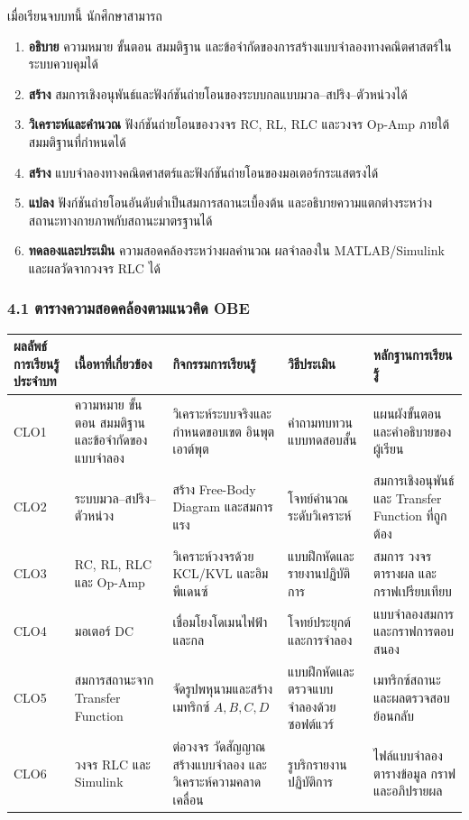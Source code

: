 เมื่อเรียนจบบทนี้ นักศึกษาสามารถ

\begin{enumerate}
    \item \textbf{อธิบาย} ความหมาย ขั้นตอน สมมติฐาน และข้อจำกัดของการสร้างแบบจำลองทางคณิตศาสตร์ในระบบควบคุมได้
    \item \textbf{สร้าง} สมการเชิงอนุพันธ์และฟังก์ชันถ่ายโอนของระบบกลแบบมวล–สปริง–ตัวหน่วงได้
    \item \textbf{วิเคราะห์และคำนวณ} ฟังก์ชันถ่ายโอนของวงจร RC, RL, RLC และวงจร Op-Amp ภายใต้สมมติฐานที่กำหนดได้
    \item \textbf{สร้าง} แบบจำลองทางคณิตศาสตร์และฟังก์ชันถ่ายโอนของมอเตอร์กระแสตรงได้
    \item \textbf{แปลง} ฟังก์ชันถ่ายโอนอันดับต่ำเป็นสมการสถานะเบื้องต้น และอธิบายความแตกต่างระหว่างสถานะทางกายภาพกับสถานะมาตรฐานได้
    \item \textbf{ทดลองและประเมิน} ความสอดคล้องระหว่างผลคำนวณ ผลจำลองใน MATLAB/Simulink และผลวัดจากวงจร RLC ได้
\end{enumerate}

\subsubsection{4.1 ตารางความสอดคล้องตามแนวคิด OBE}

\begin{table}[htbp]
    \centering
    \begin{tabular}{l l l l l}
        \hline
        \textbf{ผลลัพธ์การเรียนรู้ประจำบท} & \textbf{เนื้อหาที่เกี่ยวข้อง} & \textbf{กิจกรรมการเรียนรู้} & \textbf{วิธีประเมิน} & \textbf{หลักฐานการเรียนรู้} \\
        \hline
        CLO1 & ความหมาย ขั้นตอน สมมติฐาน และข้อจำกัดของแบบจำลอง & วิเคราะห์ระบบจริงและกำหนดขอบเขต อินพุต เอาต์พุต & คำถามทบทวน แบบทดสอบสั้น & แผนผังขั้นตอนและคำอธิบายของผู้เรียน \\
        CLO2 & ระบบมวล–สปริง–ตัวหน่วง & สร้าง Free-Body Diagram และสมการแรง & โจทย์คำนวณระดับวิเคราะห์ & สมการเชิงอนุพันธ์และ Transfer Function ที่ถูกต้อง \\
        CLO3 & RC, RL, RLC และ Op-Amp & วิเคราะห์วงจรด้วย KCL/KVL และอิมพีแดนซ์ & แบบฝึกหัดและรายงานปฏิบัติการ & สมการ วงจร ตารางผล และกราฟเปรียบเทียบ \\
        CLO4 & มอเตอร์ DC & เชื่อมโยงโดเมนไฟฟ้าและกล & โจทย์ประยุกต์และการจำลอง & แบบจำลองสมการและกราฟการตอบสนอง \\
        CLO5 & สมการสถานะจาก Transfer Function & จัดรูปพหุนามและสร้างเมทริกซ์ $A,B,C,D$ & แบบฝึกหัดและตรวจแบบจำลองด้วยซอฟต์แวร์ & เมทริกซ์สถานะและผลตรวจสอบย้อนกลับ \\
        CLO6 & วงจร RLC และ Simulink & ต่อวงจร วัดสัญญาณ สร้างแบบจำลอง และวิเคราะห์ความคลาดเคลื่อน & รูบริกรายงานปฏิบัติการ & ไฟล์แบบจำลอง ตารางข้อมูล กราฟ และอภิปรายผล \\
        \hline
    \end{tabular}
\end{table}

